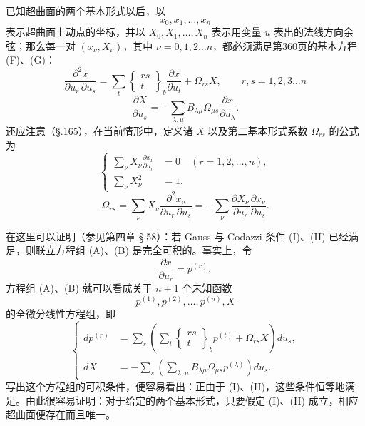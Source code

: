 已知超曲面的两个基本形式以后，以
\[
x_0,x_1,\ldots,x_n
\]
表示超曲面上动点的坐标，并以 $X_0,X_1,\ldots,X_n$ 表示用变量 $u$ 表出的法线方向余弦；那么每一对 $(x_\nu,X_\nu)$，其中 $\nu=0,1,2\ldots n$，都必须满足第360页的基本方程 (F)、(G)：
\[
\tag{A}
\frac{\partial^2 x}{\partial u_r\,\partial u_s}
=\sum_t\left\{\begin{matrix}rs\\ t\end{matrix}\right\}_b
\frac{\partial x}{\partial u_t}+\Omega_{rs}X,\qquad
r,s=1,2,3\ldots n
\]
\[
\tag{B}
\frac{\partial X}{\partial u_s}
=-\sum_{\lambda,\mu}B_{\lambda\mu}\Omega_{\mu s}\frac{\partial x}{\partial u_\lambda}.
\]
还应注意（\S.165），在当前情形中，定义诸 $X$ 以及第二基本形式系数 $\Omega_{rs}$ 的公式为
\[
\tag{C}
\left\{
\begin{aligned}
\sum_\nu X_\nu\frac{\partial x_\nu}{\partial u_r}&=0 \quad (r=1,2,\ldots,n),\\
\sum_\nu X_\nu^2&=1,
\end{aligned}\right.
\]
\[
\tag{D}
\Omega_{rs}=\sum_\nu X_\nu
\frac{\partial^2x_\nu}{\partial u_r\,\partial u_s}
=-\sum_\nu\frac{\partial X_\nu}{\partial u_r}\frac{\partial x_\nu}{\partial u_s}.
\]

在这里可以证明（参见第四章 \S.58）：若 Gauss 与 Codazzi 条件 (I)、(II) 已经满足，则联立方程组 (A)、(B) 是完全可积的。事实上，令
\[
\frac{\partial x}{\partial u_r}=p^{(r)},
\]
方程组 (A)、(B) 就可以看成关于 $n+1$ 个未知函数
\[
p^{(1)},p^{(2)},\ldots,p^{(n)},X
\]
的全微分线性方程组，即
\[
\tag{\(\alpha\)}
\left\{
\begin{aligned}
dp^{(r)}&=\sum_s\left(\sum_t\left\{\begin{matrix}rs\\ t\end{matrix}\right\}_b p^{(t)}+\Omega_{rs}X\right)du_s,\\
dX&=-\sum_s\left(\sum_{\lambda,\mu}B_{\lambda\mu}\Omega_{\mu s}p^{(\lambda)}\right)du_s.
\end{aligned}\right.
\]
写出这个方程组的可积条件，便容易看出：正由于 (I)、(II)，这些条件恒等地满足。由此很容易证明：对于给定的两个基本形式，只要假定 (I)、(II) 成立，相应超曲面便存在而且唯一。

